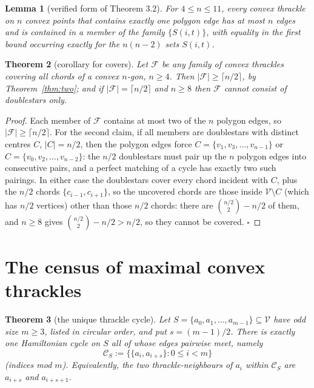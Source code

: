 \documentclass[11pt,a4paper]{article}
\newtheorem{theorem}{Theorem}[section]
\newtheorem{lemma}[theorem]{Lemma}
\theoremstyle{definition}
\theoremstyle{plain}
\newcommand{\V}{\mathcal{V}}
\newcommand{\mc}{\mathcal{C}}
\begin{document}
\begin{lemma}[verified form of Theorem 3.2]\label{lem:oneedge}
For $4\le n\le 11$, every convex thrackle on $n$ convex points that contains
exactly one polygon edge has at most $n$ edges and is contained in a member of
the family $\{S(i,t)\}$, with equality in the first bound occurring exactly for
the $n(n-2)$ sets $S(i,t)$.
\end{lemma}

\begin{theorem}[corollary for covers]\label{cor:cover}
Let $\mathcal{F}$ be any family of convex thrackles covering all chords of a
convex $n$-gon, $n\ge4$.  Then $|\mathcal{F}|\ge\lceil n/2\rceil$, by
Theorem~\ref{thm:two}; and if $|\mathcal{F}|=\lceil n/2\rceil$ and $n\ge8$ then
$\mathcal{F}$ cannot consist of doublestars only.
\end{theorem}

\begin{proof}
Each member of $\mathcal{F}$ contains at most two of the $n$ polygon edges, so
$|\mathcal{F}|\ge\lceil n/2\rceil$.  For the second claim, if all members are
doublestars with distinct centres $C$, $|C|=n/2$, then the polygon edges force
$C=\{v_1,v_3,\dots,v_{n-1}\}$ or $C=\{v_0,v_2,\dots,v_{n-2}\}$: the $n/2$
doublestars must pair up the $n$ polygon edges into consecutive pairs, and a
perfect matching of a cycle has exactly two such pairings.  In either case the
doublestars cover every chord incident with $C$, plus the $n/2$ chords
$\{c_{i-1},c_{i+1}\}$, so the uncovered chords are those inside
$\V\setminus C$ (which has $n/2$ vertices) other than those $n/2$ chords: there
are $\binom{n/2}{2}-n/2$ of them, and $n\ge8$ gives $\binom{n/2}{2}-n/2>n/2$, so
they cannot be covered. \hfill$\square$
\end{proof}

\section{The census of maximal convex thrackles}

\begin{theorem}[the unique thrackle cycle]\label{thm:cycle}
Let $S=\{a_0,a_1,\dots,a_{m-1}\}\subseteq\V$ have odd size $m\ge3$, listed in
circular order, and put $s=(m-1)/2$.  There is exactly one Hamiltonian cycle on
$S$ all of whose edges pairwise meet, namely
\[
\mc_S:=\bigl\{\{a_i,a_{i+s}\}:0\le i<m\bigr\}
\]
(indices mod $m$).  Equivalently, the two thrackle-neighbours of $a_i$ within
$\mc_S$ are $a_{i+s}$ and $a_{i+s+1}$.
\end{theorem}
\end{document}
